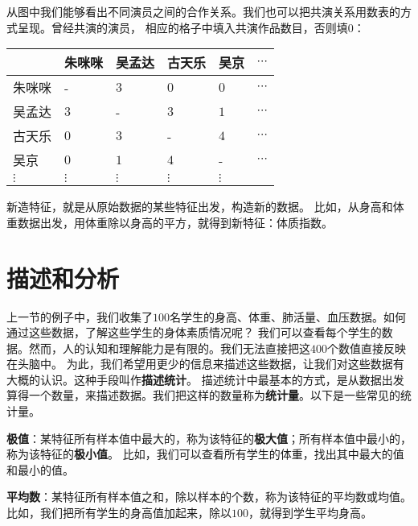 \documentclass[12pt,UTF8]{ctexbook}
\theoremstyle{definition}
\theoremstyle{plain}
\newtheorem{xt}{习题}[section]
\begin{document}
从图中我们能够看出不同演员之间的合作关系。我们也可以把共演关系用数表的方式呈现。曾经共演的演员，
相应的格子中填入共演作品数目，否则填$0$：
\begin{center}
    \begin{tabular}{ | p{3.2em}<{\centering} | p{3.2em}<{\centering} | p{3.2em}<{\centering} | p{3.2em}<{\centering} | p{3.2em}<{\centering} | p{2em}<{\centering} | }
        \hline
           & 朱咪咪 & 吴孟达 & 古天乐 & 吴京 & $\cdots$ \\ [0.5ex]
        \hline
        朱咪咪 & - & $3$ & $0$ & $0$ & $\cdots$ \\  
        \hline
        吴孟达 & $3$ & - & $3$ & $1$ & $\cdots$ \\  
        \hline
        古天乐 & $0$ & $3$ & - & $4$ & $\cdots$ \\ 
        \hline
        吴京 & $0$ & $1$ & $4$ & - & $\cdots$ \\ 
        \hline
        $\vdots$ & $\vdots$ & $\vdots$ & $\vdots$ & $\vdots$ &  \\  
        \hline
    \end{tabular}
\end{center}

新造特征，就是从原始数据的某些特征出发，构造新的数据。
比如，从身高和体重数据出发，用体重除以身高的平方，就得到新特征：体质指数。


\section{描述和分析}
上一节的例子中，我们收集了$100$名学生的身高、体重、肺活量、血压数据。如何通过这些数据，了解这些学生的身体素质情况呢？
我们可以查看每个学生的数据。然而，人的认知和理解能力是有限的。我们无法直接把这$400$个数值直接反映在头脑中。
为此，我们希望用更少的信息来描述这些数据，让我们对这些数据有大概的认识。这种手段叫作\textbf{描述统计}。
描述统计中最基本的方式，是从数据出发算得一个数量，来描述数据。我们把这样的数量称为\textbf{统计量}。以下是一些常见的统计量。

\textbf{极值}：某特征所有样本值中最大的，称为该特征的\textbf{极大值}；所有样本值中最小的，称为该特征的\textbf{极小值}。
比如，我们可以查看所有学生的体重，找出其中最大的值和最小的值。

\textbf{平均数}：某特征所有样本值之和，除以样本的个数，称为该特征的平均数或均值。
比如，我们把所有学生的身高值加起来，除以$100$，就得到学生平均身高。
\end{document}
